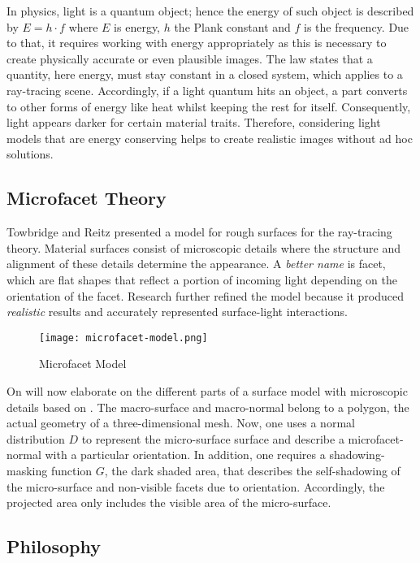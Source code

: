 In physics, light is a quantum object; hence the energy of such object is described by $E = h \cdot f$ where $E$ is energy, $h$ the Plank constant and $f$ is the frequency.
Due to that, it requires working with energy appropriately as this is necessary to create physically accurate or even plausible images.
The law states that a quantity, here energy, must stay constant in a closed system, which applies to a ray-tracing scene.
Accordingly, if a light quantum hits an object, a part converts to other forms of energy like heat whilst keeping the rest for itself.
Consequently, light appears darker for certain material traits.
Therefore, considering light models that are energy conserving helps to create realistic images without ad hoc solutions.

\subsection{Microfacet Theory}

Towbridge and Reitz \cite{trowbridge_average_1975} presented a model for rough surfaces for the ray-tracing theory.
Material surfaces consist of microscopic details where the structure and alignment of these details determine the appearance.
A \textit{better name} is facet, which are flat shapes that reflect a portion of incoming light depending on the orientation of the facet.
Research further refined the model because it produced \textit{realistic} results and accurately represented surface-light interactions.

\begin{figure}[h]
\centering
\texttt{[image: microfacet-model.png]}
\caption[]{Microfacet Model}
\label{fig:microfacet-normal}
\end{figure}

On will now elaborate on the different parts of a surface model with microscopic details based on \cite{heitz_understanding_2014}.
The macro-surface and macro-normal belong to a polygon, the actual geometry of a three-dimensional mesh.
Now, one uses a normal distribution $D$ to represent the micro-surface surface and describe a microfacet-normal with a particular orientation.
In addition, one requires a shadowing-masking function $G$, the dark shaded area, that describes the self-shadowing of the micro-surface and non-visible facets due to orientation.
Accordingly, the projected area only includes the visible area of the micro-surface.

\subsection{Philosophy}

